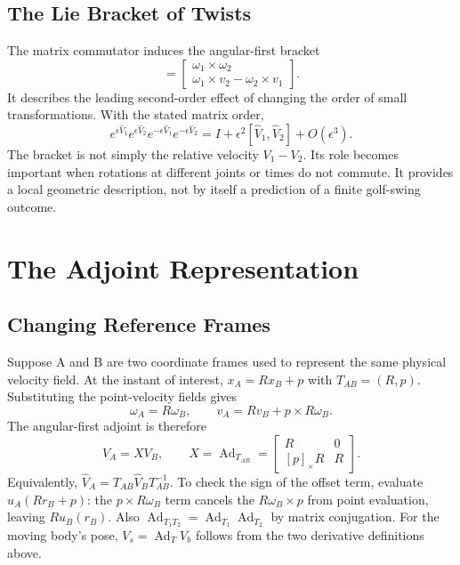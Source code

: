 \subsection{The Lie Bracket of Twists}

The matrix commutator induces the angular-first bracket
\begin{equation}
 [V_1,V_2]=\begin{bmatrix}
 \omega_1\times\omega_2\\
 \omega_1\times v_2-\omega_2\times v_1
 \end{bmatrix}.
\end{equation}
It describes the leading second-order effect of changing the order of small transformations. With the stated matrix order,
\begin{equation}
 e^{\epsilon\widehat V_1}e^{\epsilon\widehat V_2}
 e^{-\epsilon\widehat V_1}e^{-\epsilon\widehat V_2}
 =I+\epsilon^2[\widehat V_1,\widehat V_2]+O(\epsilon^3).
\end{equation}
The bracket is not simply the relative velocity $V_1-V_2$. Its role becomes important when rotations at different joints or times do not commute. It provides a local geometric description, not by itself a prediction of a finite golf-swing outcome.

\section{The Adjoint Representation}
\label{sec:adjoint}
\label{def:adjoint_definition}

\subsection{Changing Reference Frames}

Suppose A and B are two coordinate frames used to represent the same physical velocity field. At the instant of interest, $x_A=Rx_B+p$ with $T_{AB}=(R,p)$. Substituting the point-velocity fields gives
\begin{equation}
 \omega_A=R\omega_B,\qquad v_A=Rv_B+p\times R\omega_B.
\end{equation}
The angular-first adjoint is therefore
\begin{equation}
 V_A=X V_B,\qquad X=\operatorname{Ad}_{T_{AB}}
 =\begin{bmatrix}R&0\\{}[p]_\times R&R\end{bmatrix}.
\end{equation}
\label{eq:adjoint}
Equivalently, $\widehat V_A=T_{AB}\widehat V_BT_{AB}^{-1}$. To check the sign of the offset term, evaluate $u_A(Rr_B+p)$: the $p\times R\omega_B$ term cancels the $R\omega_B\times p$ from point evaluation, leaving $Ru_B(r_B)$. Also $\operatorname{Ad}_{T_1T_2}=\operatorname{Ad}_{T_1}\operatorname{Ad}_{T_2}$ by matrix conjugation. For the moving body's pose, $V_s=\operatorname{Ad}_T V_b$ follows from the two derivative definitions above.

